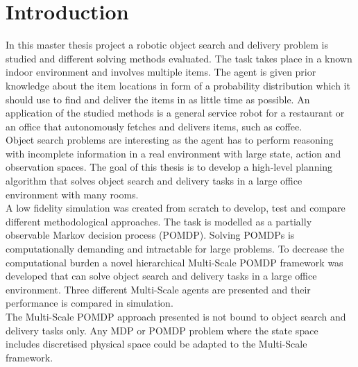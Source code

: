 \chapter{Introduction}
\label{sec:introduction}

In this master thesis project a robotic object search and delivery problem is studied and different solving methods evaluated. The task takes place in a known indoor environment and involves multiple items. The agent is given prior knowledge about the item locations in form of a probability distribution which it should use to find and deliver the items in as little time as possible. An application of the studied methods is a general service robot for a restaurant or an office that autonomously fetches and delivers items, such as coffee.\\

Object search problems are interesting as the agent has to perform reasoning with incomplete information in a real environment with large state, action and observation spaces. The goal of this thesis is to develop a high-level planning algorithm that solves object search and delivery tasks in a large office environment with many rooms.\\

 A low fidelity simulation was created from scratch to develop, test and compare different methodological approaches. The task is modelled as a partially observable Markov decision process (POMDP). Solving POMDPs is computationally demanding and intractable for large problems. To decrease the computational burden a novel hierarchical Multi-Scale POMDP framework was developed that can solve object search and delivery tasks in a large office environment. Three different Multi-Scale agents are presented and their performance is compared in simulation.\\

The Multi-Scale POMDP approach presented is not bound to object search and delivery tasks only. Any MDP or POMDP problem where the state space includes discretised physical space could be adapted to the Multi-Scale framework. 



